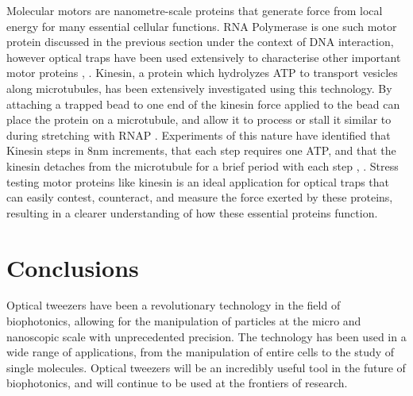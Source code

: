 \documentclass{article}
\begin{document}
Molecular motors are nanometre-scale proteins that generate force from local energy for many essential cellular functions. RNA Polymerase is one such motor protein discussed in the previous section under the context of DNA interaction, however optical traps have been used extensively to characterise other important motor proteins \cite{Bustamante2021}, \cite{Lang2003-ll}. Kinesin, a protein which hydrolyzes ATP to transport vesicles along microtubules, has been extensively investigated using this technology. By attaching a trapped bead to one end of the kinesin force applied to the bead can place the protein on a microtubule, and allow it to process or stall it similar to during stretching with RNAP \cite{Block1990}. Experiments of this nature have identified that Kinesin steps in 8nm increments, that each step requires one ATP, and that the kinesin detaches from the microtubule for a brief period with each step \cite{Lang2003-ll}, \cite{Block1990}. Stress testing motor proteins like kinesin is an ideal application for optical traps that can easily contest, counteract, and measure the force exerted by these proteins, resulting in a clearer understanding of how these essential proteins function.



\section*{Conclusions}

Optical tweezers have been a revolutionary technology in the field of biophotonics, allowing for the manipulation of particles at the micro and nanoscopic scale with unprecedented precision. The technology has been used in a wide range of applications, from the manipulation of entire cells to the study of single molecules. Optical tweezers will be an incredibly useful tool in the future of biophotonics, and will continue to be used at the frontiers of research.

\newpage


\end{document}
